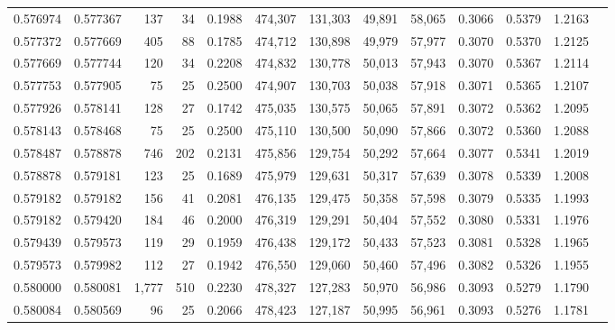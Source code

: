 \begin{tabular}{rrrrrrrrrrrrr}
0.576974 & 0.577367 &   137 &  34 &                                     0.1988 & 474,307 & 131,303 &  49,891 &  58,065 & 0.3066 & 0.5379 & 1.2163 \\
0.577372 & 0.577669 &   405 &  88 &                                     0.1785 & 474,712 & 130,898 &  49,979 &  57,977 & 0.3070 & 0.5370 & 1.2125 \\
0.577669 & 0.577744 &   120 &  34 &                                     0.2208 & 474,832 & 130,778 &  50,013 &  57,943 & 0.3070 & 0.5367 & 1.2114 \\
0.577753 & 0.577905 &    75 &  25 &                                     0.2500 & 474,907 & 130,703 &  50,038 &  57,918 & 0.3071 & 0.5365 & 1.2107 \\
0.577926 & 0.578141 &   128 &  27 &                                     0.1742 & 475,035 & 130,575 &  50,065 &  57,891 & 0.3072 & 0.5362 & 1.2095 \\
0.578143 & 0.578468 &    75 &  25 &                                     0.2500 & 475,110 & 130,500 &  50,090 &  57,866 & 0.3072 & 0.5360 & 1.2088 \\
0.578487 & 0.578878 &   746 & 202 &                                     0.2131 & 475,856 & 129,754 &  50,292 &  57,664 & 0.3077 & 0.5341 & 1.2019 \\
0.578878 & 0.579181 &   123 &  25 &                                     0.1689 & 475,979 & 129,631 &  50,317 &  57,639 & 0.3078 & 0.5339 & 1.2008 \\
0.579182 & 0.579182 &   156 &  41 &                                     0.2081 & 476,135 & 129,475 &  50,358 &  57,598 & 0.3079 & 0.5335 & 1.1993 \\
0.579182 & 0.579420 &   184 &  46 &                                     0.2000 & 476,319 & 129,291 &  50,404 &  57,552 & 0.3080 & 0.5331 & 1.1976 \\
0.579439 & 0.579573 &   119 &  29 &                                     0.1959 & 476,438 & 129,172 &  50,433 &  57,523 & 0.3081 & 0.5328 & 1.1965 \\
0.579573 & 0.579982 &   112 &  27 &                                     0.1942 & 476,550 & 129,060 &  50,460 &  57,496 & 0.3082 & 0.5326 & 1.1955 \\
0.580000 & 0.580081 & 1,777 & 510 &                                     0.2230 & 478,327 & 127,283 &  50,970 &  56,986 & 0.3093 & 0.5279 & 1.1790 \\
0.580084 & 0.580569 &    96 &  25 &                                     0.2066 & 478,423 & 127,187 &  50,995 &  56,961 & 0.3093 & 0.5276 & 1.1781 \\

\end{tabular}
